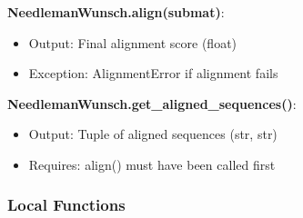 \documentclass[12pt, titlepage]{article}
\begin{document}
\noindent \textbf{NeedlemanWunsch.align(submat)}:
\begin{itemize}
    \item Output: Final alignment score (float)
    \item Exception: AlignmentError if alignment fails
\end{itemize}

\noindent \textbf{NeedlemanWunsch.get\_aligned\_sequences()}:
\begin{itemize}
    \item Output: Tuple of aligned sequences (str, str)
    \item Requires: align() must have been called first
\end{itemize}

\subsubsection{Local Functions}

    
    
\end{document}
